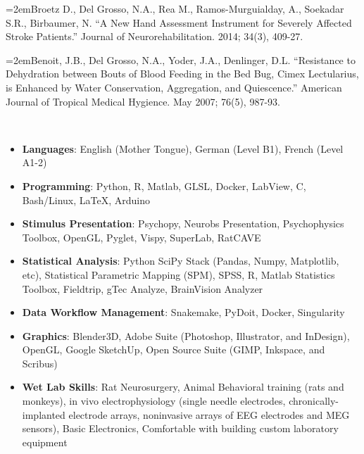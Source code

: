 \documentclass{article}%
\newcommand{\SubHeading}[1]{\vspace{1em}\noindent\spacedlowsmallcaps{#1}\vspace{0.7em}\\}%
\newcommand{\Description}[1]{\hangindent=2em\hangafter=0\footnotesize{#1}\par\normalsize\vspace{1em}}%
\begin{document}
\begin{cv}{}
\Description{Broetz D., Del Grosso, N.A., Rea M., Ramos{-}Murguialday, A., Soekadar S.R., Birbaumer, N. ``A New Hand Assessment Instrument for Severely Affected Stroke Patients.''  Journal of Neurorehabilitation. 2014; 34(3), 409{-}27.}%
\Description{Benoit, J.B., Del Grosso, N.A., Yoder, J.A., Denlinger, D.L. ``Resistance to Dehydration between Bouts of Blood Feeding in the Bed Bug, Cimex Lectularius, is Enhanced by Water Conservation, Aggregation, and Quiescence.'' American Journal of Tropical Medical Hygience. May 2007; 76(5), 987{-}93.}%
\SubHeading{Skills}%
\begin{itemize}%
\item%
\textbf{Languages}: English (Mother Tongue), German (Level B1), French (Level A1-2)%
\end{itemize}%
\begin{itemize}%
\item%
\textbf{Programming}: Python, R, Matlab, GLSL, Docker, LabView, C, Bash/Linux, LaTeX, Arduino%
\end{itemize}%
\begin{itemize}%
\item%
\textbf{Stimulus Presentation}: Psychopy, Neurobs Presentation, Psychophysics Toolbox, OpenGL, Pyglet, Vispy, SuperLab, RatCAVE%
\end{itemize}%
\begin{itemize}%
\item%
\textbf{Statistical Analysis}: Python SciPy Stack (Pandas, Numpy, Matplotlib, etc), Statistical Parametric Mapping (SPM), SPSS, R, Matlab Statistics Toolbox, Fieldtrip, gTec Analyze, BrainVision Analyzer%
\end{itemize}%
\begin{itemize}%
\item%
\textbf{Data Workflow Management}: Snakemake, PyDoit, Docker, Singularity%
\end{itemize}%
\begin{itemize}%
\item%
\textbf{Graphics}: Blender3D, Adobe Suite (Photoshop, Illustrator, and InDesign), OpenGL, Google SketchUp, Open Source Suite (GIMP, Inkspace, and Scribus)%
\end{itemize}%
\begin{itemize}%
\item%
\textbf{Wet Lab Skills}: Rat Neurosurgery, Animal Behavioral training (rats and monkeys), in vivo electrophysiology (single needle electrodes, chronically-implanted electrode arrays, noninvasive arrays of EEG electrodes and MEG sensors), Basic Electronics, Comfortable with building custom laboratory equipment%

\end{itemize}
\end{cv}
\end{document}
